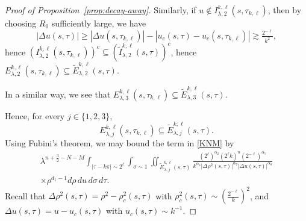 \documentclass[leqno]{amsart}
\theoremstyle{definition}
\theoremstyle{remark}
\numberwithin{equation}{section}
\begin{document}
\begin{proof}[Proof of Proposition~\ref{prop:decay-away}]
 Similarly, if $ u \notin I_{\lambda,2}^{k,\ell}(s,\tau_{k,\ell})$, then by choosing $R_0$ sufficiently large, we  have 
 \[
|\Delta u (s,\tau)| \ge |\Delta u (s,\tau_{k,\ell} )| - | u _c(s,\tau)- u _c(s,\tau_{k,\ell} )| \gtrsim \tfrac{2^{-\ell}}{k^2}, 
\]
hence 
$(I_{\lambda,2}^{k,\ell}(s,\tau_{k,\ell}))^c\subseteq (\tilde I_{\lambda,2}^{k,\ell}(s,\tau))^c$, hence  
$E_{\lambda,2}^{k,\ell}(s,\tau_{k,\ell}) \subseteq \tilde E_{\lambda,2}^{k,\ell}(s,\tau).$

In a similar way, we see that $E_{\lambda,3}^{k,\ell}(s,\tau_{k,\ell}) \subseteq \tilde E_{\lambda,3}^{k,\ell}(s,\tau)$.

Hence, for every $j\in\{1,2,3\}$,
\[
E_{\lambda,j}^{k,\ell}(s,\tau_{k,\ell}) \subseteq \tilde E_{\lambda,j}^{k,\ell}(s,\tau).
\]
Using Fubini's theorem, we may bound the term in \eqref{KNM}  by
\begin{multline*}
\lambda^{n + \frac{3}{2}-N-M} \int_{|\tau-k\pi|\sim 2^{\ell}} \int_{\sigma\sim 1} \iint_{\tilde E_{\lambda,j}^{k,\ell}(s,\tau)} \frac{(2^{\ell})^{\alpha_2} (2^\ell k)^{n} (2^{-\ell})^{\alpha_5} }{k^{\alpha_ 4 } \left| \Delta \rho^2(s,\tau) \right|^{\alpha_7}\left| \Delta u (s,\tau) \right|^{\alpha_8} } \\ \times \rho^{d_1-1} d\rho \, d u \, d\sigma \, d \tau.
\end{multline*}
Recall that $\Delta \rho^2(s,\tau) = \rho^2 - \rho^2_c(s,\tau)$ with $\rho^2_c(s,\tau)\sim (\tfrac{2^{-\ell}}{k})^2$, and $\Delta u (s,\tau) = u - u _c(s,\tau)$ with $u_c(s,\tau)\sim k^{-1}.$


\end{proof}
\end{document}
